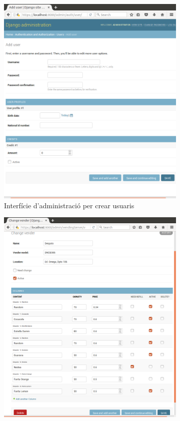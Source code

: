 \begin{figure}[H]
	\centering
	\begin{subfigure}[b]{0.45\textwidth}
		\includegraphics[width=\textwidth]{images/admin1}
		\caption{Interfície d'administració per crear usuaris}
		\label{fig:admin1}
	\end{subfigure}
	\hspace{0.5cm}
	\begin{subfigure}[b]{0.45\textwidth}
		\includegraphics[width=\textwidth]{images/admin2}

\end{subfigure}
\end{figure}
